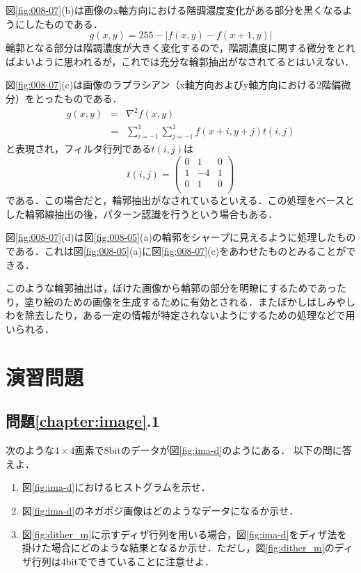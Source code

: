 図\ref{fig:008-07}(b)は画像のx軸方向における階調濃度変化がある部分を黒くなるようにしたものである．
\begin{equation}
g(x,y)=255-|f(x,y)-f(x+1,y)|
\end{equation}
輪郭となる部分は階調濃度が大きく変化するので，階調濃度に関する微分をとればよいように思われるが，これでは充分な輪郭抽出がなされてるとはいえない．

図\ref{fig:008-07}(c)は画像のラプラシアン（x軸方向およびy軸方向における2階偏微分）をとったものである．
\begin{eqnarray}
g(x,y)&=& \nabla^2 f(x,y) \nonumber \\
 &=&\sum_{i=-1}^{1} \sum_{j=-1}^{1} f(x+i,y+j)t(i,j)
\end{eqnarray}
と表現され，フィルタ行列である$t(i,j)$は
\begin{equation}
t(i,j)=\left (
\begin{array}{ccc}
0 & 1 & 0 \\
1 & -4 & 1 \\
0 & 1 & 0 \\
\end{array}
\right )
\end{equation}
である．この場合だと，輪郭抽出がなされているといえる．この処理をベースとした輪郭線抽出の後，パターン認識を行うという場合もある．

図\ref{fig:008-07}(d)は図\ref{fig:008-05}(a)の輪郭をシャープに見えるように処理したものである．これは図\ref{fig:008-05}(a)に図\ref{fig:008-07}(c)をあわせたものとみることができる．

このような輪郭抽出は，ぼけた画像から輪郭の部分を明瞭にするためであったり，塗り絵のための画像を生成するために有効とされる．またぼかしはしみやしわを除去したり，ある一定の情報が特定されないようにするための処理などで用いられる．

\section*{演習問題}

\subsection*{問題\ref{chapter:image}.1}

次のような$4\times 4$画素で8bitのデータが図\ref{fig:ima-d}のようにある．
以下の問に答えよ．
\begin{enumerate}[(1)]
\item 図\ref{fig:ima-d}におけるヒストグラムを示せ．
\item 図\ref{fig:ima-d}のネガポジ画像はどのようなデータになるか示せ．
\item 図\ref{fig:dither_m}に示すディザ行列を用いる場合，図\ref{fig:ima-d}をディザ法を掛けた場合にどのような結果となるか示せ．ただし，図\ref{fig:dither_m}のディザ行列は4bitでできていることに注意せよ．
\end{enumerate}

